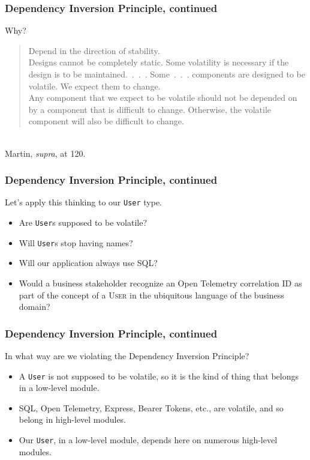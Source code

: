 \documentclass[aspectratio=169]{beamer}
\begin{document}
\begin{frame}
  \frametitle{Dependency Inversion Principle, continued}
  Why?
  \vspace{1em}
  \\
  \begin{quote}
    Depend in the direction of stability. \\

    Designs cannot be completely static. Some volatility is necessary if the
    design is to be maintained.~.~.~. Some~.~.~. components are designed to be
    volatile.  We expect them to change. \\

    Any component that we expect to be volatile should not be depended on by a
    component that is difficult to change.  Otherwise, the volatile component
    will also be difficult to change.
  \end{quote}\\
  \vspace{1em}
  Martin, \textit{supra}, at 120.
\end{frame}

\begin{frame}
  \frametitle{Dependency Inversion Principle, continued}
  Let's apply this thinking to our \texttt{User} type.

  \begin{itemize}
    \item Are \texttt{User}s supposed to be volatile?
    \item Will \texttt{User}s stop having names?
    \item Will our application always use SQL?
    \item Would a business stakeholder recognize an Open Telemetry correlation
          ID as part of the concept of a \textsc{User} in the ubiquitous
          language of the business domain?
  \end{itemize}
\end{frame}

\begin{frame}
  \frametitle{Dependency Inversion Principle, continued}
  In what way are we violating the Dependency Inversion Principle?
  \begin{itemize}
    \item A \texttt{User} is not supposed to be volatile, so it is the kind of
          thing that belongs in a low-level module.
    \item SQL, Open Telemetry, Express, Bearer Tokens, etc., are volatile,
          and so belong in high-level modules.
    \item Our \texttt{User}, in a low-level module, depends here on numerous
          high-level modules.
  \end{itemize}
\end{frame}
\end{document}
